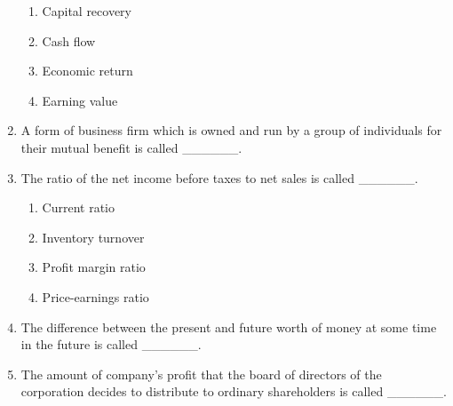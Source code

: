\documentclass[11pt,a4paper]{article}
\begin{document}
\begin{enumerate}
\begin{enumerate}[label=\Alph*.]
\item{Capital recovery}
\item{Cash flow}
\item{Economic return}
\item{Earning value}
\end{enumerate}
\item{A form of business firm which is owned and run by a group of individuals for their mutual benefit is called \_\_\_\_\_\_.}
\\
\item{The ratio of the net income before taxes to net sales is called \_\_\_\_\_\_.}
\begin{enumerate}[label=\Alph*.]
\item{Current ratio}
\item{Inventory turnover}
\item{Profit margin ratio}
\item{Price-earnings ratio}
\end{enumerate}
\item{The difference between the present and future worth of money at some time in the future is called \_\_\_\_\_\_.}
\\
\item{The amount of company's profit that the board of directors of the corporation decides to distribute to ordinary shareholders is called \_\_\_\_\_\_.
}
\\

\end{enumerate}
\end{document}
